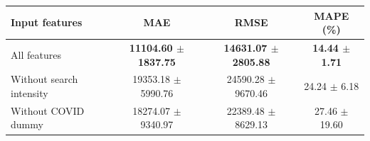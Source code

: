 \begin{tabular}{lccc}
\hline
Input features  & MAE & RMSE & MAPE (\%) \\
\hline
All features & \textbf{11104.60 $\pm$ 1837.75} & \textbf{14631.07 $\pm$ 2805.88} & \textbf{14.44 $\pm$ 1.71} \\
Without search intensity & 19353.18 $\pm$ 5990.76 & 24590.28 $\pm$ 9670.46 & 24.24 $\pm$ 6.18 \\
Without COVID dummy & 18274.07 $\pm$ 9340.97 & 22389.48 $\pm$ 8629.13 & 27.46 $\pm$ 19.60 \\
\hline
\end{tabular}
